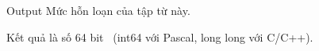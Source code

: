 Output
Mức hỗn loạn của tập từ này.

Kết quả là số 64 bit  (int64 với Pascal, long long với C/C++).